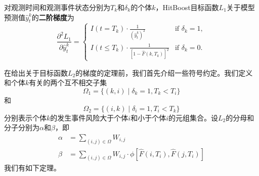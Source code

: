 \begin{theorem}\label{thm:1.2}
对观测时间和观测事件状态分别为$T_k$和$\delta_k$的个体$k$，HitBoost目标函数$L_1$关于模型预测值$\hat{y}_t^k$的\textbf{二阶梯度}为$$
\frac{\partial^2 L_1}{\partial \hat{y}_t^k}=
\begin{cases}
I(t=T_k)\cdot \frac{1}{{(\hat{y}_t^k)}^2} & \text{if } \delta_k = 1,\\
I(t\le T_k)\cdot \frac{1}{{[1-\hat{F}(k, T_k)]}^2} & \text{if } \delta_k = 0.
\end{cases}
$$
\end{theorem}

在给出关于目标函数$L_2$的梯度的定理前，我们首先介绍一些符号约定。我们定义和个体$k$有关的两个互不相交子集\begin{equation}
\Omega_1=\{(k,i) \mid \delta_k=1,T_k < T_i\}
\end{equation}
和
\begin{equation}
\Omega_2=\{(i,k) \mid \delta_i=1,T_i < T_k\}
\end{equation}
分别表示个体$k$的发生事件风险大于个体$i$和小于个体$i$的元组集合。设$L_2$的分母和分子分别为$\alpha$和$\beta$，即
\begin{equation}
\begin{split}
\alpha &= \sum_{(i,j)\in \Omega} W_{i,j}\\
\beta &= \sum_{(i,j)\in \Omega} W_{i,j} \cdot \phi\left[ \hat{F}(i, T_i), \hat{F}(j, T_i) \right]
\end{split}
\end{equation}
我们有如下定理。

